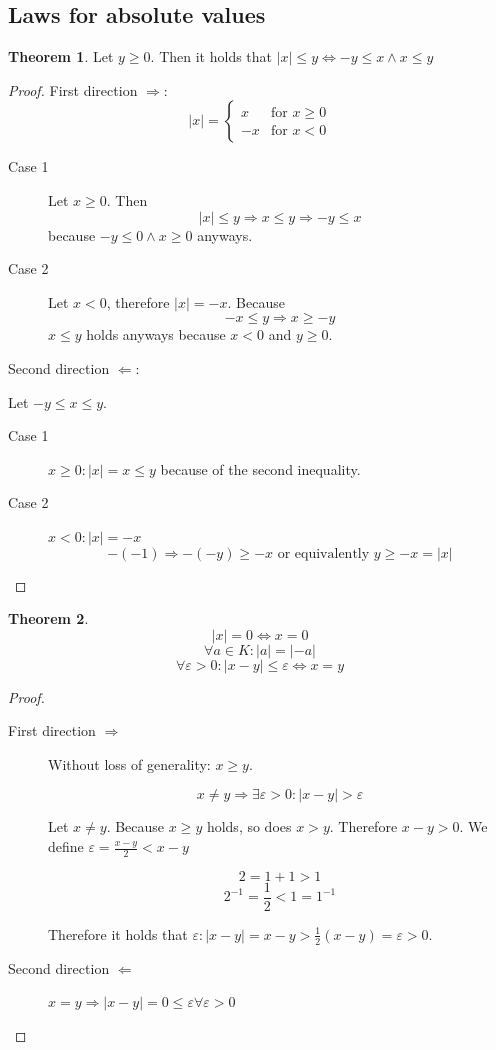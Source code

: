 \documentclass[a4paper,landscape,twocolumn]{article}
\theoremstyle{definition}
\newtheorem{theorem}{Theorem}
\newcommand\abs[1]{\left|#1\right|}
\begin{document}
\subsection{Laws for absolute values}
%
\begin{theorem}
  Let $y \geq 0$. Then it holds that $\abs{x} \leq y \Leftrightarrow -y \leq x \land x \leq y$
\end{theorem}
\begin{proof}
  First direction $\Rightarrow$:
  \[
    \abs{x} = \begin{cases}
      x & \text{for } x \geq 0\\
      -x & \text{for } x < 0
    \end{cases}
  \]
  \begin{description}
    \item[Case 1] Let $x \geq 0$. Then
      \[ \abs{x} \leq y \Rightarrow x \leq y \Rightarrow -y \leq x \]
      because $-y \leq 0 \land x \geq 0$ anyways.
    \item[Case 2] Let $x < 0$, therefore $\abs{x} = -x$. Because
      \[ -x \leq y \Rightarrow x \geq -y \]
      $x \leq y$ holds anyways because $x < 0$ and $y \geq 0$.
  \end{description}

  Second direction $\Leftarrow$:

  Let $-y \leq x \leq y$.
  \begin{description}
    \item[Case 1] $x \geq 0: \abs{x} = x \leq y$ because of the second inequality.
    \item[Case 2] $x < 0: \abs{x} = -x$
      \[ -(-1) \Rightarrow -(-y) \geq -x \text{ or equivalently } y \geq -x = \abs{x} \]
  \end{description}
\end{proof}

\begin{theorem}
  \[ \abs{x} = 0 \Leftrightarrow x = 0 \]
  \[ \forall a \in K: \abs{a} = \abs{-a} \]
  \[ \forall \varepsilon > 0: \abs{x - y} \leq \varepsilon \Leftrightarrow x = y \]
\end{theorem}

\begin{proof}
  \begin{description}
    \item[First direction $\Rightarrow$]
      Without loss of generality: $x \geq y$.

      \[ x \neq y \Rightarrow \exists \varepsilon > 0: \abs{x - y} > \varepsilon \]

      Let $x \neq y$. Because $x \geq y$ holds, so does $x > y$. Therefore $x - y > 0$.
      We define $\varepsilon = \frac{x-y}{2} < x - y$

      \[ 2 = 1 + 1 > 1 \]
      \[ 2^{-1} = \frac12 < 1 = 1^{-1} \]

      Therefore it holds that $\varepsilon: \abs{x-y} = x - y > \frac12(x - y) = \varepsilon > 0$.

    \item[Second direction $\Leftarrow$]
      $x = y \Rightarrow \abs{x-y} = 0 \leq \varepsilon \forall \varepsilon > 0$
  \end{description}
\end{proof}
\end{document}
